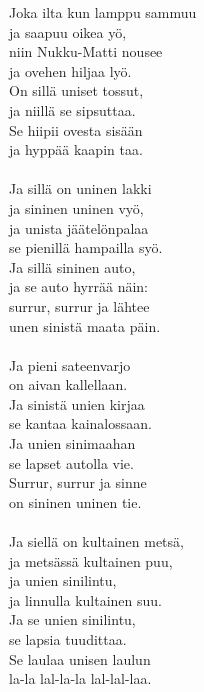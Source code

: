
        Joka ilta kun lamppu sammuu \\
        ja saapuu oikea yö, \\
        niin Nukku-Matti nousee \\
        ja ovehen hiljaa lyö. \\
        On sillä uniset tossut, \\
        ja niillä se sipsuttaa. \\
        Se hiipii ovesta sisään \\
        ja hyppää kaapin taa. \\
\hspace{10mm} \\
        Ja sillä on uninen lakki \\
        ja sininen uninen vyö, \\
        ja unista jäätelönpalaa \\
        se pienillä hampailla syö. \\
        Ja sillä sininen auto, \\
        ja se auto hyrrää näin: \\
        surrur, surrur ja lähtee \\
        unen sinistä maata päin. \\
\hspace{10mm} \\
        Ja pieni sateenvarjo \\
        on aivan kallellaan. \\
        Ja sinistä unien kirjaa \\
        se kantaa kainalossaan. \\
        Ja unien sinimaahan \\
        se lapset autolla vie. \\
        Surrur, surrur ja sinne \\
        on sininen uninen tie. \\
\hspace{10mm} \\
        Ja siellä on kultainen metsä, \\
        ja metsässä kultainen puu, \\
        ja unien sinilintu, \\
        ja linnulla kultainen suu. \\
        Ja se unien sinilintu, \\
        se lapsia tuudittaa. \\
        Se laulaa unisen laulun \\
        la-la lal-la-la lal-lal-laa. \\
